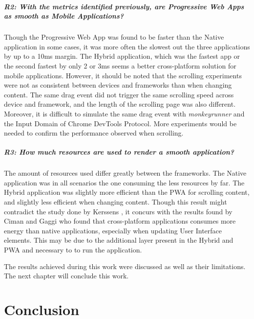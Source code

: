 \documentclass{kththesis}
\begin{document}
\paragraph{R2: With the metrics identified previously, are Progressive Web Apps as smooth as Mobile Applications?}
Though the Progressive Web App was found to be faster than the Native application in some cases, it was more often the slowest out the three applications by up to a 10ms margin. The Hybrid application, which was the fastest app or the second fastest by only 2 or 3ms seems a better cross-platform solution for mobile applications. \newline
However, it should be noted that the scrolling experiments were not as consistent between devices and frameworks than when changing content. The same drag event did not trigger the same scrolling speed across device and framework, and the length of the scrolling page was also different. Moreover, it is difficult to simulate the same drag event with \textit{monkeyrunner} and the Input Domain of Chrome DevTools Protocol. More experiments would be needed to confirm the performance observed when scrolling.

\paragraph{R3: How much resources are used to render a smooth application?}
The amount of resources used differ greatly between the frameworks. The Native application was in all scenarios the one consuming the less resources by far. The Hybrid application was slightly more efficient than the PWA for scrolling content, and slightly less efficient when changing content. Though this result might contradict the study done by Kerssens \cite{PWAapplicability}, it concurs with the results found by Ciman and Gaggi \cite{ciman2017empirical} who found that cross-platform applications consumes more energy than native applications, especially when updating User Interface elements. This may be due to the additional layer present in the Hybrid and PWA and necessary to to run the application.

\fi


The results achieved during this work were discussed as well as their limitations. The next chapter will conclude this work. 


\chapter{Conclusion}
\end{document}
